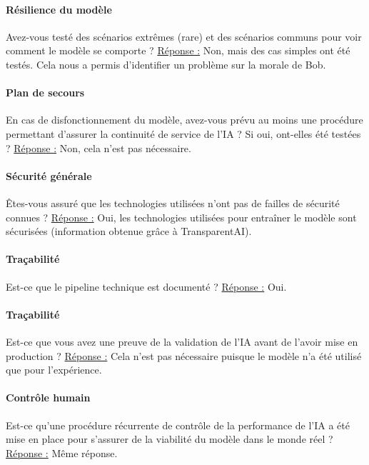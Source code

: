 \documentclass[10pt, french, a4paper]{report}
\begin{document}
\paragraph{Résilience du modèle} 
Avez-vous testé des scénarios extrêmes (rare) et des scénarios communs pour voir comment le modèle se comporte ?
\newline
\underline{Réponse :} Non, mais des cas simples ont été testés. Cela nous a permis d'identifier un problème sur la morale de Bob.

\paragraph{Plan de secours} 
En cas de disfonctionnement du modèle, avez-vous prévu au moins une procédure permettant d'assurer la continuité de service de l'IA ? Si oui, ont-elles été testées ?
\newline
\underline{Réponse :} Non, cela n'est pas nécessaire.

\paragraph{Sécurité générale} 
\uppercase{ê}tes-vous assuré que les technologies utilisées n'ont pas de failles de sécurité connues ?
\newline
\underline{Réponse :} Oui, les technologies utilisées pour entraîner le modèle sont sécurisées (information obtenue grâce à TransparentAI).

\paragraph{Traçabilité} 
Est-ce que le pipeline technique est documenté ?
\newline
\underline{Réponse :} Oui.

\paragraph{Traçabilité} 
Est-ce que vous avez une preuve de la validation de l'IA avant de l'avoir mise en production ?
\newline
\underline{Réponse :} Cela n'est pas nécessaire puisque le modèle n'a été utilisé que pour l'expérience.

\paragraph{Contrôle humain} 
Est-ce qu'une procédure récurrente de contrôle de la performance de l'IA a été mise en place pour s'assurer de la viabilité du modèle dans le monde réel ?
\newline
\underline{Réponse :} Même réponse.
\end{document}
